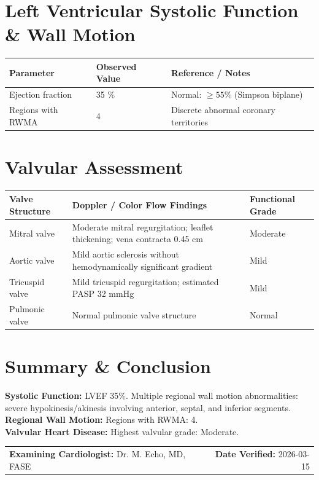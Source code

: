 \documentclass[10pt,a4paper]{article}
\begin{document}
\section*{Left Ventricular Systolic Function \& Wall Motion}

\begin{tabular}{@{} p{6.8cm} p{2.8cm} p{5.5cm} @{}}
  \toprule
  \textbf{Parameter} & \textbf{Observed Value} & \textbf{Reference / Notes} \\
  \midrule
  Ejection fraction & 35 \% & Normal: $\ge 55$\% (Simpson biplane) \\
  Regions with RWMA & 4 & Discrete abnormal coronary territories \\
  \bottomrule
\end{tabular}

\vspace{10pt}

\section*{Valvular Assessment}

\begin{tabular}{@{} p{3.2cm} p{8.4cm} p{3.2cm} @{}}
  \toprule
  \textbf{Valve Structure} & \textbf{Doppler / Color Flow Findings} & \textbf{Functional Grade} \\
  \midrule
  Mitral valve & Moderate mitral regurgitation; leaflet thickening; vena contracta 0.45 cm & Moderate \\
  Aortic valve & Mild aortic sclerosis without hemodynamically significant gradient & Mild \\
  Tricuspid valve & Mild tricuspid regurgitation; estimated PASP 32 mmHg & Mild \\
  Pulmonic valve & Normal pulmonic valve structure & Normal \\
  \bottomrule
\end{tabular}

\vspace{10pt}

\section*{Summary \& Conclusion}

\noindent
\textbf{Systolic Function:} LVEF 35\%. Multiple regional wall motion abnormalities: severe hypokinesis/akinesis involving anterior, septal, and inferior segments.\\
\textbf{Regional Wall Motion:} Regions with RWMA: 4.\\
\textbf{Valvular Heart Disease:} Highest valvular grade: Moderate.

\vspace{18pt}

\noindent
\begin{tabular*}{\textwidth}{@{} l @{\extracolsep{\fill}} r @{}}
  \textbf{Examining Cardiologist:} Dr. M. Echo, MD, FASE & \textbf{Date Verified:} 2026-03-15 \\
\end{tabular*}
\end{document}
